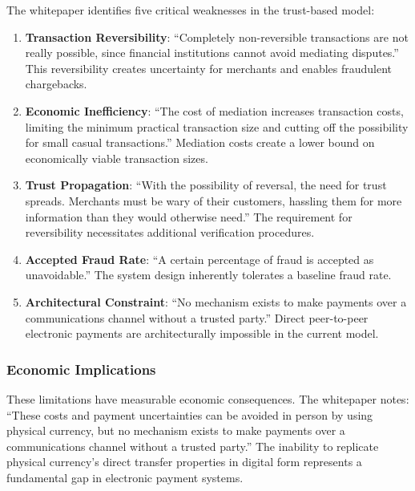 The whitepaper identifies five critical weaknesses in the trust-based model:

\begin{enumerate}
  \item \textbf{Transaction Reversibility}: ``Completely non-reversible transactions are not really possible, since financial institutions cannot avoid mediating disputes.'' This reversibility creates uncertainty for merchants and enables fraudulent chargebacks.

  \item \textbf{Economic Inefficiency}: ``The cost of mediation increases transaction costs, limiting the minimum practical transaction size and cutting off the possibility for small casual transactions.'' Mediation costs create a lower bound on economically viable transaction sizes.

  \item \textbf{Trust Propagation}: ``With the possibility of reversal, the need for trust spreads. Merchants must be wary of their customers, hassling them for more information than they would otherwise need.'' The requirement for reversibility necessitates additional verification procedures.

  \item \textbf{Accepted Fraud Rate}: ``A certain percentage of fraud is accepted as unavoidable.'' The system design inherently tolerates a baseline fraud rate.

  \item \textbf{Architectural Constraint}: ``No mechanism exists to make payments over a communications channel without a trusted party.'' Direct peer-to-peer electronic payments are architecturally impossible in the current model.
\end{enumerate}

\subsubsection{Economic Implications}

These limitations have measurable economic consequences. The whitepaper notes: ``These costs and payment uncertainties can be avoided in person by using physical currency, but no mechanism exists to make payments over a communications channel without a trusted party.'' The inability to replicate physical currency's direct transfer properties in digital form represents a fundamental gap in electronic payment systems.

